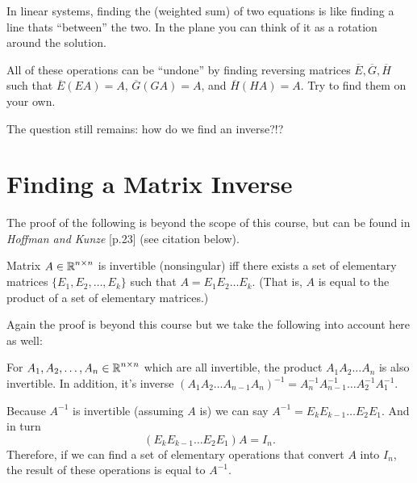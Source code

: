 \begin{aside}
In linear systems, finding the (weighted sum) of two equations is like finding a line thats ``between'' the two. 
In the plane you can think of it as a rotation around the solution. 
\end{aside}

All of these operations can be ``undone'' by finding reversing matrices $\overline{E},\overline{G},\overline{H}$ such that 
$\overline{E}(EA)=A$, $\overline{G}(GA)=A$, and $\overline{H}(HA)=A$. 
Try to find them on your own.  

The question still remains: 
how do we find an inverse?!?

\section{Finding a Matrix Inverse}
The proof of the following is beyond the scope of this course, but can be found in \textit{Hoffman and Kunze} [p.23] (see citation below). 

\begin{tcolorbox}
Matrix $A\in\operatorname{\mathbb{R}}^{n\times n}$ is invertible (nonsingular) iff 
there exists a set of elementary matrices $\{E_1, E_2, \hdots, E_k\}$ 
such that $A =  E_1E_2\hdots E_k$.
(That is, $A$ is equal to the product of a set of elementary matrices.)
\end{tcolorbox}

Again the proof is beyond this course but we take the following into account here as well: 
\begin{tcolorbox}
For $A_1, A_2, \hdots, A_n\in\operatorname{\mathbb{R}}^{n\times n}$ which are all invertible, 
the product $A_1A_2\hdots A_n$ is also invertible. 
In addition, it's inverse $\left(A_1A_2\hdots A_{n-1}A_n\right)^{-1} = A_n^{-1}A_{n-1}^{-1}\hdots A_2^{-1}A_1^{-1}$.
\end{tcolorbox}

Because $A^{-1}$ is invertible (assuming $A$ is) we can say $A^{-1} = E_kE_{k-1}\hdots E_2E_1$.
And in turn \[(E_kE_{k-1}\hdots E_2E_1)A = I_n.\] 
Therefore, if we can find a set of elementary operations that convert $A$ into $I_n$, 
the result of these operations is equal to $A^{-1}$. 

